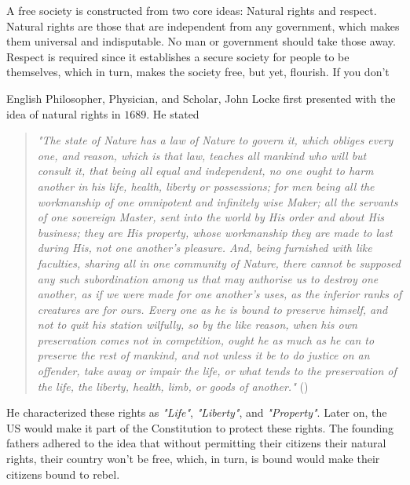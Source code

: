 \doublespacing



A free society is constructed from two core ideas: Natural rights and
respect. Natural rights are those that are independent from any government,
which makes them universal and indisputable. No man or government should take
those away. Respect is required since it establishes a secure society for people
to be themselves, which in turn, makes the society free, but yet, flourish. If
you don't


English Philosopher, Physician, and Scholar, John Locke first presented with the
idea of natural rights in $1689$. He stated

\begin{center}
	\begin{quotation}
		\textit{"The state of Nature has a law of Nature to govern it, which obliges
			every one, and reason, which is that law, teaches all mankind who will but
			consult it, that being all equal and independent, no one ought to harm
			another in his life, health, liberty or possessions; for men being all the
			workmanship of one omnipotent and infinitely wise Maker; all the servants
			of one sovereign Master, sent into the world by His order and about His
			business; they are His property, whose workmanship they are made to last
			during His, not one another’s pleasure. And, being furnished with like
			faculties, sharing all in one community of Nature, there cannot be
			supposed any such subordination among us that may authorise us to destroy
			one another, as if we were made for one another’s uses, as the inferior
			ranks of creatures are for ours. Every one as he is bound to preserve
			himself, and not to quit his station wilfully, so by the like reason, when
			his own preservation comes not in competition, ought he as much as he can
			to preserve the rest of mankind, and not unless it be to do justice on an
			offender, take away or impair the life, or what tends to the preservation
			of the life, the liberty, health, limb, or goods of another."}
		(\cite{noauthor_right_nodate})
	\end{quotation}
\end{center}

\noindent He characterized these rights as \textit{"Life"}, \textit{"Liberty"},
and \textit{"Property"}. Later on, the US would make it part of the Constitution
to protect these rights. The founding fathers adhered to the idea that without
permitting their citizens their natural rights, their country won't be free,
which, in turn, is bound would make their citizens bound to rebel.

